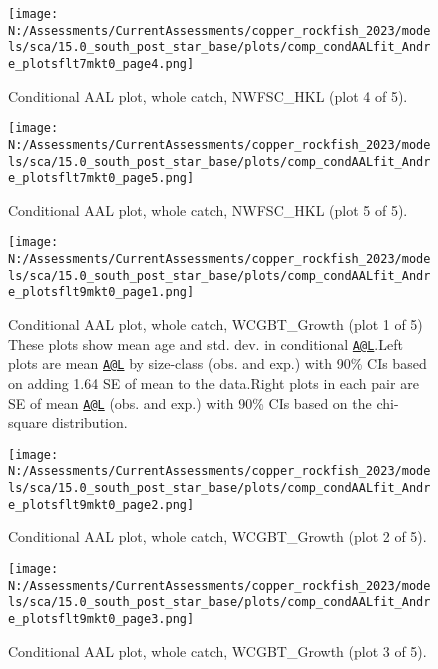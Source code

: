 \documentclass[11pt,
  english,
  letterpaper,
]{article}
\begin{document}
\begin{figure}
\centering
\texttt{[image: N:/Assessments/CurrentAssessments/copper\_rockfish\_2023/models/sca/15.0\_south\_post\_star\_base/plots/comp\_condAALfit\_Andre\_plotsflt7mkt0\_page4.png]}
\caption{Conditional AAL plot, whole catch, NWFSC\_HKL (plot 4 of 5).\label{fig:comp_condAALfit_Andre_plotsflt7mkt0_page4}}
\end{figure}

\begin{figure}
\centering
\texttt{[image: N:/Assessments/CurrentAssessments/copper\_rockfish\_2023/models/sca/15.0\_south\_post\_star\_base/plots/comp\_condAALfit\_Andre\_plotsflt7mkt0\_page5.png]}
\caption{Conditional AAL plot, whole catch, NWFSC\_HKL (plot 5 of 5).\label{fig:comp_condAALfit_Andre_plotsflt7mkt0_page5}}
\end{figure}

\begin{figure}
\centering
\texttt{[image: N:/Assessments/CurrentAssessments/copper\_rockfish\_2023/models/sca/15.0\_south\_post\_star\_base/plots/comp\_condAALfit\_Andre\_plotsflt9mkt0\_page1.png]}
\caption{Conditional AAL plot, whole catch, WCGBT\_Growth (plot 1 of 5) These plots show mean age and std. dev. in conditional \href{mailto:A@L}{\nolinkurl{A@L}}.Left plots are mean \href{mailto:A@L}{\nolinkurl{A@L}} by size-class (obs. and exp.) with 90\% CIs based on adding 1.64 SE of mean to the data.Right plots in each pair are SE of mean \href{mailto:A@L}{\nolinkurl{A@L}} (obs. and exp.) with 90\% CIs based on the chi-square distribution.\label{fig:comp_condAALfit_Andre_plotsflt9mkt0_page1}}
\end{figure}

\begin{figure}
\centering
\texttt{[image: N:/Assessments/CurrentAssessments/copper\_rockfish\_2023/models/sca/15.0\_south\_post\_star\_base/plots/comp\_condAALfit\_Andre\_plotsflt9mkt0\_page2.png]}
\caption{Conditional AAL plot, whole catch, WCGBT\_Growth (plot 2 of 5).\label{fig:comp_condAALfit_Andre_plotsflt9mkt0_page2}}
\end{figure}

\begin{figure}
\centering
\texttt{[image: N:/Assessments/CurrentAssessments/copper\_rockfish\_2023/models/sca/15.0\_south\_post\_star\_base/plots/comp\_condAALfit\_Andre\_plotsflt9mkt0\_page3.png]}
\caption{Conditional AAL plot, whole catch, WCGBT\_Growth (plot 3 of 5).\label{fig:comp_condAALfit_Andre_plotsflt9mkt0_page3}}
\end{figure}
\end{document}
